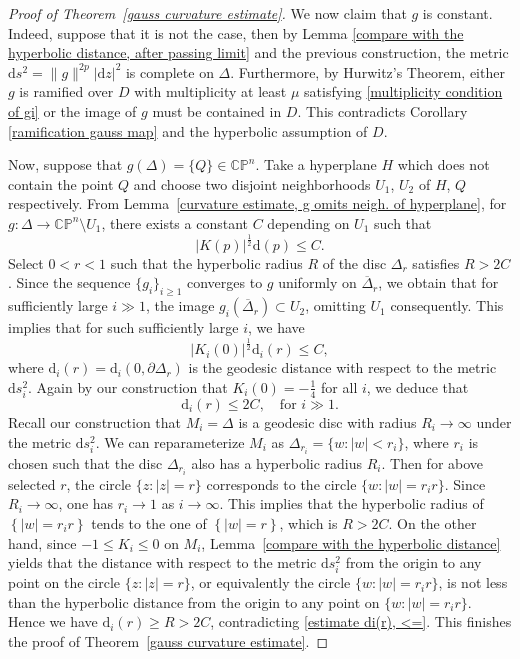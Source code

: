 \documentclass[english, 12pt]{amsart}
\theoremstyle{plain}
\theoremstyle{remark}
\numberwithin{equation}{section}
\theoremstyle{plain}
\theoremstyle{named}
\begin{document}
\begin{proof}[Proof of Theorem~\ref{gauss curvature estimate}]
	We now claim that $g$ is constant. Indeed, suppose that it is not the case, then by Lemma \ref{compare with the hyperbolic distance, after passing limit} and the previous construction, the metric $\mathrm{d}s^2=\|g\|^{2p}|\mathrm{d}z|^2$ is complete on $\Delta$. Furthermore, by Hurwitz's Theorem, either $g$ is ramified over $D$ with multiplicity at least $\mu$ satisfying \eqref{multiplicity condition of gi} or the image of $g$ must be contained in $D$. This contradicts Corollary \ref{ramification gauss map} and the hyperbolic assumption of $D$.
	
	Now, suppose that $g(\Delta)=\{Q\}\in \mathbb{CP}^n$. Take a hyperplane $H$ which does not contain the point $Q$ and choose two disjoint neighborhoods $U_1$, $U_2$ of $H$, $Q$ respectively. From Lemma~\ref{curvature estimate, g omits neigh. of hyperplane}, for $g\colon \Delta\rightarrow \mathbb{CP}^n\setminus U_1$, there exists a constant $C$ depending on $U_1$ such that
	\[
	|K(p)|^{\frac{1}{2}}\mathrm{d}(p)\leq C.
	\]
	Select $0<r<1$ such that the hyperbolic radius $R$ of the disc $\Delta_r$ satisfies $R>2C$.   
	Since the sequence $\{g_i\}_{i\geq 1}$ converges to $g$ uniformly on $\overline{\Delta}_r$, we obtain that for sufficiently large $i\gg 1$, the image $g_i\left(\overline{\Delta}_r\right)\subset U_2$, omitting $U_1$ consequently. This implies that for such sufficiently large $i$, we have
	\[
	|K_i(0)|^{\frac{1}{2}}\mathrm{d}_i(r)\leq C,
	\]
	where $\mathrm{d}_i(r)=\mathrm{d}_i\left(0,\partial \Delta_r\right)$ is the geodesic distance with respect to the metric $\mathrm{d}s_i^2$. Again by our construction that $K_i(0)=-\frac{1}{4}$ for all $i$, we deduce that 
	\begin{equation}\label{estimate di(r), <=}
		\mathrm{d}_i(r)\leq 2C,\quad \text{for $i\gg 1$}.
	\end{equation}
	Recall our construction that $M_i=\Delta$ is a geodesic disc with radius $R_i\to \infty$ under the metric $\mathrm{d}s_i^2$. We can reparameterize $M_i$ as $\Delta_{r_i}=\{w:|w|<r_i\}$, where $r_i$ is chosen such that the disc $\Delta_{r_i}$ also has a hyperbolic radius $R_i$. Then for above selected $r$, the circle $\{z:|z|=r\}$ corresponds to the circle $\{w:|w|=r_ir\}$. Since $R_i\rightarrow \infty$, one has $r_i\rightarrow 1$ as $i\rightarrow\infty$. This implies that the hyperbolic radius of $\left\{|w|=r_ir\right\}$ tends to the one of $\left\{|w|=r\right\}$, which is $R>2C$. On the other hand, since $-1\leq K_i\leq 0$ on $M_i$,  Lemma~\ref{compare with the hyperbolic distance} yields that the distance with respect to the metric $\mathrm{d}s^2_i$ from the origin to any point on the circle $\{z:|z|=r\}$, or equivalently the circle $\{w:|w|=r_ir\}$, is not less than the hyperbolic distance from the origin to any point on $\{w:|w|=r_ir\}$. Hence we have $\mathrm{d}_i(r)\geq R>2C$, contradicting \eqref{estimate di(r), <=}. 
	This finishes the proof of Theorem~\ref{gauss curvature estimate}.
\end{proof}
\end{document}
